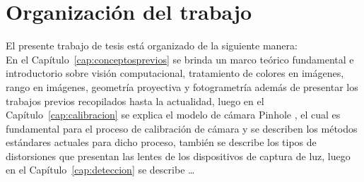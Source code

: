 \section{Organización del trabajo}
El presente trabajo de tesis está organizado de la siguiente manera: \\
En el Capítulo~\ref{cap:conceptosprevios} se brinda un marco teórico fundamental e introductorio 
sobre visión computacional, tratamiento de colores en imágenes, rango en imágenes, geometría
proyectiva  y fotogrametría además de presentar los trabajos previos recopilados hasta la actualidad, 
luego en el Capítulo~\ref{cap:calibracion} se explica el modelo 
de cámara Pinhole , el cual es fundamental para el proceso de calibración de cámara y se describen los métodos 
estándares actuales para dicho proceso, también se describe los tipos de distorsiones 
que presentan las lentes de los dispositivos de captura de luz, luego en el Capítulo~\ref{cap:deteccion}  se describe \ldots
